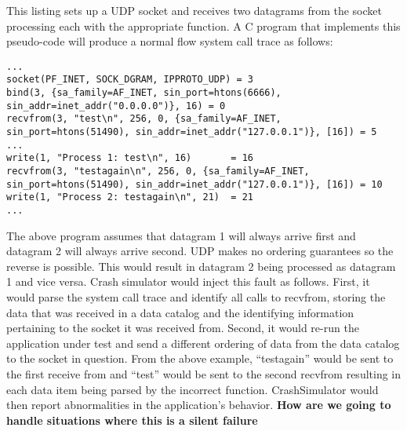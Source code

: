         This listing sets up a UDP socket and receives two datagrams from the socket processing each with the
        appropriate function. A C program that implements this pseudo-code will produce a normal flow system call trace
        as follows:

        \begin{verbatim}
...
socket(PF_INET, SOCK_DGRAM, IPPROTO_UDP) = 3
bind(3, {sa_family=AF_INET, sin_port=htons(6666), sin_addr=inet_addr("0.0.0.0")}, 16) = 0
recvfrom(3, "test\n", 256, 0, {sa_family=AF_INET, sin_port=htons(51490), sin_addr=inet_addr("127.0.0.1")}, [16]) = 5
...
write(1, "Process 1: test\n", 16)       = 16
recvfrom(3, "testagain\n", 256, 0, {sa_family=AF_INET, sin_port=htons(51490), sin_addr=inet_addr("127.0.0.1")}, [16]) = 10
write(1, "Process 2: testagain\n", 21)  = 21
...
        \end{verbatim}

        The above program assumes that datagram 1 will always arrive first and datagram 2 will always arrive second. UDP
        makes no ordering guarantees so the reverse is possible. This would result in datagram 2 being processed as
        datagram 1 and vice versa. Crash simulator would inject this fault as follows. First, it would parse the system
        call trace and identify all calls to recvfrom, storing the data that was received in a data catalog and the
        identifying information pertaining to the socket it was received from. Second, it would re-run the application
        under test and send a different ordering of data from the data catalog to the socket in question. From the above
        example, ``testagain'' would be sent to the first receive from and ``test'' would be sent to the second recvfrom
        resulting in each data item being parsed by the incorrect function. CrashSimulator would then report
        abnormalities in the application's behavior. \textbf{How are we going to handle situations where this is a
        silent failure}

